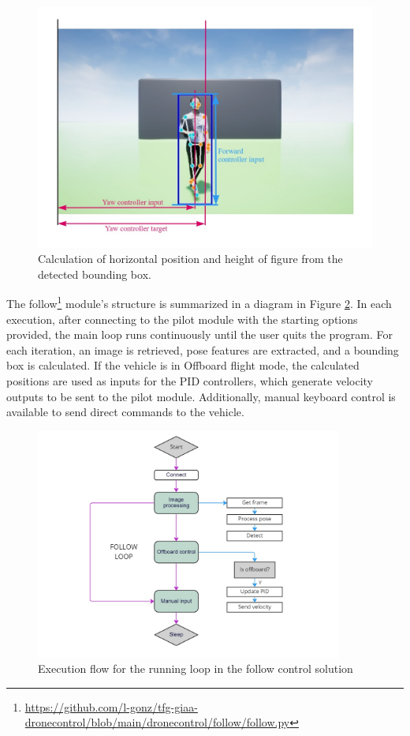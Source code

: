 \begin{figure}
  \centering
  \includegraphics[width=\textwidth, keepaspectratio]{img/pose-calculations.jpg}
  \caption{Calculation of horizontal position and height of figure from the detected bounding box.}
  \label{fig:follow-input-calcs}
\end{figure}

The follow\footnote{\url{https://github.com/l-gonz/tfg-giaa-dronecontrol/blob/main/dronecontrol/follow/follow.py}} module's structure is summarized in a diagram in Figure \ref{fig:follow-loop}.
In each execution, after connecting to the pilot module with the starting options provided, the main loop runs continuously until the user quits the program.
For each iteration, an image is retrieved, pose features are extracted, and a bounding box is calculated. If the vehicle is in Offboard flight mode, the calculated positions are used as inputs for the PID controllers, which generate velocity outputs to be sent to the pilot module. Additionally, manual keyboard control is available to send direct commands to the vehicle.

\begin{figure}
  \centering
  \includegraphics[width=0.9\textwidth, keepaspectratio]{img/follow-loop.jpg}
  \caption{Execution flow for the running loop in the follow control solution}
  \label{fig:follow-loop}
\end{figure}

